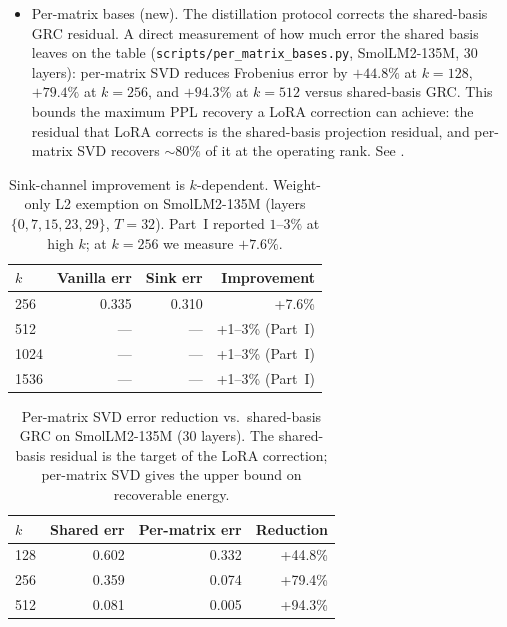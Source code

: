\documentclass[11pt]{article}
\begin{document}
\begin{itemize}
\item Per-matrix bases (new).  The distillation protocol
      corrects the shared-basis GRC residual.  A direct measurement of
      how much error the shared basis leaves on the table
      (\texttt{scripts/per\_matrix\_bases.py}, SmolLM2-135M, 30 layers):
      per-matrix SVD reduces Frobenius error by $+44.8\%$ at $k{=}128$,
      $+79.4\%$ at $k{=}256$, and $+94.3\%$ at $k{=}512$ versus
      shared-basis GRC.  This bounds the maximum PPL recovery a LoRA
      correction can achieve: the residual that LoRA corrects is the
      shared-basis projection residual, and per-matrix SVD recovers
      ${\sim}80\%$ of it at the operating rank.  See
      .
\end{itemize}

\begin{table}[h]\centering\small
\caption{Sink-channel improvement is $k$-dependent.  Weight-only L2
exemption on SmolLM2-135M (layers $\{0,7,15,23,29\}$, $T{=}32$).
Part~I reported $1$--$3\%$ at high $k$; at $k{=}256$ we measure
$+7.6\%$.}
\label{tab:sink-k-dependent}
\begin{tabular}{@{}lrrr@{}}
\toprule
$k$ & Vanilla err & Sink err & Improvement \\
\midrule
256  & 0.335 & 0.310 & +7.6\% \\
512  & ---   & ---   & +1--3\% (Part~I) \\
1024 & ---   & ---   & +1--3\% (Part~I) \\
1536 & ---   & ---   & +1--3\% (Part~I) \\
\bottomrule
\end{tabular}
\end{table}

\begin{table}[h]\centering\small
\caption{Per-matrix SVD error reduction vs.\ shared-basis GRC on
SmolLM2-135M (30 layers).  The shared-basis residual is the target
of the LoRA correction; per-matrix SVD gives the upper bound on
recoverable energy.}
\label{tab:per-matrix-error}
\begin{tabular}{@{}lrrr@{}}
\toprule
$k$ & Shared err & Per-matrix err & Reduction \\
\midrule
128 & 0.602 & 0.332 & +44.8\% \\
256 & 0.359 & 0.074 & +79.4\% \\
512 & 0.081 & 0.005 & +94.3\% \\
\bottomrule
\end{tabular}
\end{table}
\end{document}
